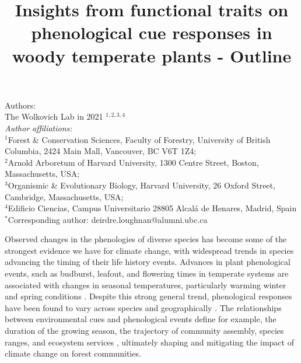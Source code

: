 \documentclass{article}\usepackage[]{graphicx}\usepackage[]{color}
\title{Insights from functional traits on phenological cue responses in woody temperate plants - Outline}
\begin{document}
\maketitle

\noindent Authors:\\
The Wolkovich Lab in 2021 $^{1,2,3,4}$
\vspace{2ex}\\
\emph{Author affiliations:}\\
$^{1}$Forest \& Conservation Sciences, Faculty of Forestry, University of British Columbia, 2424 Main Mall, Vancouver, BC V6T 1Z4;\\
$^{2}$Arnold Arboretum of Harvard University, 1300 Centre Street, Boston, Massachusetts, USA;\\
$^{3}$Organismic \& Evolutionary Biology, Harvard University, 26 Oxford Street, Cambridge, Massachusetts, USA;\\
$^{4}$Edificio Ciencias, Campus Universitario 28805 Alcalá de Henares, Madrid, Spain\\
 

\vspace{2ex}
$^*$Corresponding author: deirdre.loughnan@alumni.ubc.ca\\
\renewcommand{\thetable}{\arabic{table}}
\renewcommand{\thefigure}{\arabic{figure}}
\renewcommand{\labelitemi}{$-$}

Observed changes in the phenologies of diverse species has become some of the strongest evidence we have for climate change, with widespread trends in species advancing the timing of their life history events. Advances in plant phenological events, such as budburst, leafout, and flowering times in temperate systems are associated with changes in seasonal temperatures, particularly warming winter and spring conditions \citep{MillerRushing2008, Menzel2006, Fitter2002b}. Despite this strong general trend, phenological responses have been found to vary across species and geographically \citep{Chuine2010}. The relationships between environmental cues and phenological events define for example, the duration of the growing season, the trajectory of community assembly, species ranges, and ecosystem services \citep{White1997, Chuine2010, Cleland2007}, ultimately shaping and mitigating the impact of climate change on forest communities.
\end{document}
